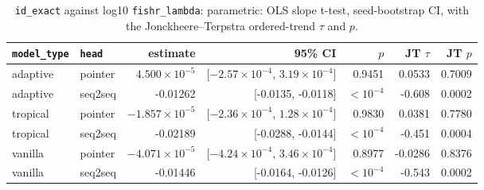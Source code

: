 \documentclass[10pt]{article}
\begin{document}
{\small
\begin{longtable}{llrrrrr}
\caption{\texttt{id\_exact} against log10 \texttt{fishr\_lambda}: parametric: OLS slope t-test, seed-bootstrap CI, with the Jonckheere--Terpstra ordered-trend $\tau$ and $p$.}\label{tab:trend-id_exact}\\
\toprule
\texttt{model\_type} & \texttt{head} & estimate & 95\% CI & $p$ & JT $\tau$ & JT $p$\\
\midrule
\endhead
adaptive & pointer & $4.500\times10^{-5}$ & [$-2.57\times10^{-4}$, $3.19\times10^{-4}$] & 0.9451 & 0.0533 & 0.7009\\
adaptive & seq2seq & -0.01262 & [-0.0135, -0.0118] & $<10^{-4}$ & -0.608 & 0.0002\\
tropical & pointer & $-1.857\times10^{-5}$ & [$-2.36\times10^{-4}$, $1.28\times10^{-4}$] & 0.9830 & 0.0381 & 0.7780\\
tropical & seq2seq & -0.02189 & [-0.0288, -0.0144] & $<10^{-4}$ & -0.451 & 0.0004\\
vanilla & pointer & $-4.071\times10^{-5}$ & [$-4.24\times10^{-4}$, $3.46\times10^{-4}$] & 0.8977 & -0.0286 & 0.8376\\
vanilla & seq2seq & -0.01446 & [-0.0164, -0.0126] & $<10^{-4}$ & -0.543 & 0.0002\\
\bottomrule
\end{longtable}
}
\end{document}
